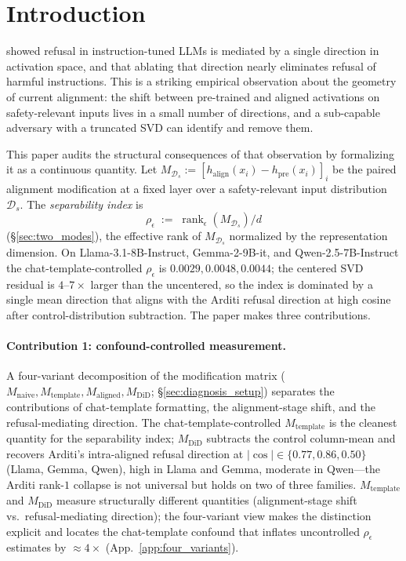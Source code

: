 \documentclass[10pt]{article}
\theoremstyle{definition}
\theoremstyle{remark}
\begin{document}
\section{Introduction}
\label{sec:intro}

\citet{arditi2024refusal} showed refusal in
instruction-tuned LLMs is mediated by a single
direction in activation space, and that ablating that
direction nearly eliminates refusal of harmful
instructions.  This is a striking
empirical observation about the geometry of current
alignment: the shift between pre-trained and aligned
activations on safety-relevant inputs lives in a small
number of directions, and a sub-capable adversary with
a truncated SVD can identify and remove them.

This paper audits the structural consequences of that
observation by formalizing it as a continuous quantity.
Let $M_{\mathcal{D}_s} := [h_{\mathrm{align}}(x_i) -
h_{\mathrm{pre}}(x_i)]_i$ be the paired alignment
modification at a fixed layer over a safety-relevant
input distribution $\mathcal{D}_s$.  The
\emph{separability index} is
\[
  \rho_{\epsilon}
  \;:=\;
  \operatorname{rank}_{\epsilon}(M_{\mathcal{D}_s})/d
\]
(\S\ref{sec:two_modes}), the effective rank of
$M_{\mathcal{D}_s}$ normalized by the representation
dimension.  On Llama-3.1-8B-Instruct, Gemma-2-9B-it,
and Qwen-2.5-7B-Instruct the chat-template-controlled
$\rho_{\epsilon}$ is $0.0029, 0.0048, 0.0044$; the
centered SVD residual is $4$--$7\times$ larger than the
uncentered, so the index is dominated by a single mean
direction that aligns with the Arditi refusal direction
at high cosine after control-distribution subtraction.
The paper makes three contributions.

\paragraph{Contribution 1: confound-controlled measurement.}
A four-variant decomposition of the modification
matrix
($M_{\mathrm{naive}}, M_{\mathrm{template}},
M_{\mathrm{aligned}}, M_{\mathrm{DiD}}$;
\S\ref{sec:diagnosis_setup}) separates the
contributions of chat-template formatting, the
alignment-stage shift, and the refusal-mediating
direction.  The
chat-template-controlled $M_{\mathrm{template}}$ is the
cleanest quantity for the separability index;
$M_{\mathrm{DiD}}$ subtracts the control column-mean
and recovers Arditi's intra-aligned refusal direction
at $|\cos|\in\{0.77, 0.86, 0.50\}$ (Llama, Gemma,
Qwen), high in Llama and Gemma, moderate in Qwen---the
Arditi rank-$1$ collapse is not universal but holds on
two of three families.  $M_{\mathrm{template}}$ and
$M_{\mathrm{DiD}}$ measure structurally different
quantities (alignment-stage shift vs.\ refusal-mediating
direction); the four-variant view makes the distinction
explicit and locates the chat-template confound that
inflates uncontrolled $\rho_{\epsilon}$ estimates by
${\approx}4\times$ (App.~\ref{app:four_variants}).
\end{document}
